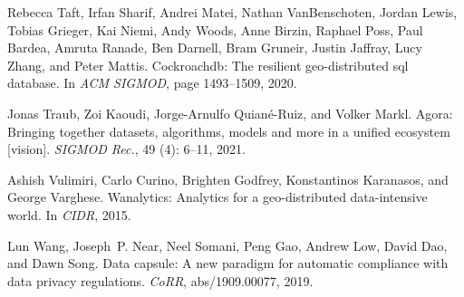 \documentclass[11pt]{article}
\begin{document}
\begin{thebibliography}{10}
\begin{small}
Rebecca Taft, Irfan Sharif, Andrei Matei, Nathan VanBenschoten, Jordan Lewis,
  Tobias Grieger, Kai Niemi, Andy Woods, Anne Birzin, Raphael Poss, Paul
  Bardea, Amruta Ranade, Ben Darnell, Bram Gruneir, Justin Jaffray, Lucy Zhang,
  and Peter Mattis.
\newblock Cockroachdb: The resilient geo-distributed sql database.
\newblock In \emph{ACM SIGMOD}, page 1493–1509, 2020.

Jonas Traub, Zoi Kaoudi, Jorge-Arnulfo Quian\'{e}-Ruiz, and Volker Markl.
\newblock Agora: Bringing together datasets, algorithms, models and more in a
  unified ecosystem [vision].
\newblock \emph{SIGMOD Rec.}, 49 (4): 6–11, 2021.

Ashish Vulimiri, Carlo Curino, Brighten Godfrey, Konstantinos Karanasos, and
  George Varghese.
\newblock Wanalytics: Analytics for a geo-distributed data-intensive world.
\newblock In \emph{CIDR}, 2015.

Lun Wang, Joseph~P. Near, Neel Somani, Peng Gao, Andrew Low, David Dao, and
  Dawn Song.
\newblock Data capsule: {A} new paradigm for automatic compliance with data
  privacy regulations.
\newblock \emph{CoRR}, abs/1909.00077, 2019.



\end{small}
\end{thebibliography}
\end{document}
